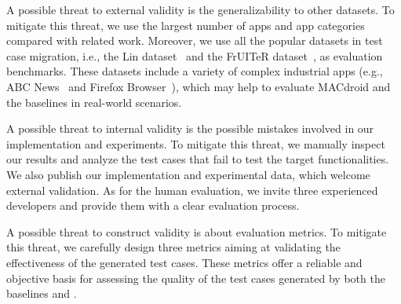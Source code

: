 A possible threat to external validity is the generalizability to other datasets. To mitigate this threat, we use the largest number of apps and app categories compared with related work. 
Moreover, we use all the popular datasets in test case migration, i.e., the Lin dataset~\cite{lin2019test} and the FrUITeR dataset~\cite{fruiter-dataset}, as evaluation benchmarks. These datasets include a variety of complex industrial apps (e.g., ABC News~\cite{abc-news} and Firefox Browser~\cite{firefox}), which may help to evaluate MACdroid and the baselines in real-world scenarios.






A possible threat to internal validity is the possible mistakes involved in our implementation and experiments.
To mitigate this threat, we manually inspect our results and analyze the test cases that fail to test the target functionalities.
We also publish our implementation and experimental data, which welcome external validation.
As for the human evaluation, we invite three experienced developers and provide them with a clear evaluation process.

A possible threat to construct validity is about evaluation metrics.
To mitigate this threat, we carefully design three metrics aiming at validating the effectiveness of the generated test cases. These metrics offer a reliable and objective basis for assessing the quality of the test cases generated by both the baselines and \toolNameSmall{}.
